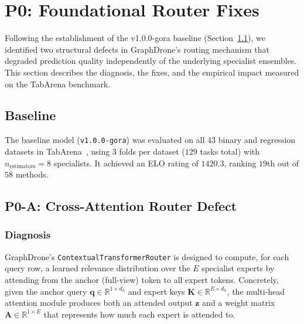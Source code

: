 
\section{P0: Foundational Router Fixes}
\label{sec:p0_fixes}

Following the establishment of the v1.0.0-gora baseline
(Section~\ref{sec:baseline}), we identified two structural defects in
GraphDrone's routing mechanism that degraded prediction quality
independently of the underlying specialist ensembles.
This section describes the diagnosis, the fixes, and the empirical
impact measured on the TabArena benchmark.

\subsection{Baseline}
\label{sec:baseline}

The baseline model (\texttt{v1.0.0-gora}) was evaluated on all
$43$ binary and regression datasets in TabArena~\cite{tabarena2025},
using $3$ folds per dataset ($129$ tasks total) with
$n_{\text{estimators}} = 8$ specialists.
It achieved an ELO rating of $\mathbf{1420.3}$, ranking $19$th out
of $58$ methods.

\subsection{P0-A: Cross-Attention Router Defect}
\label{sec:p0a}

\subsubsection{Diagnosis}

GraphDrone's \texttt{ContextualTransformerRouter} is designed to
compute, for each query row, a learned relevance distribution over the
$E$ specialist experts by attending from the anchor (full-view) token
to all expert tokens.
Concretely, given the anchor query $\mathbf{q} \in \mathbb{R}^{1
\times d_h}$ and expert keys $\mathbf{K} \in \mathbb{R}^{E \times
d_h}$, the multi-head attention module produces both an attended output
$\mathbf{z}$ and a weight matrix $\mathbf{A} \in \mathbb{R}^{1 \times
E}$ that represents how much each expert is attended to.

